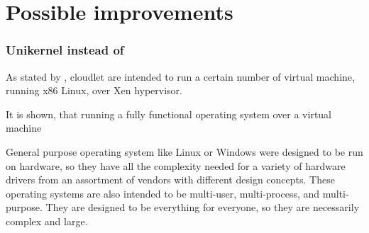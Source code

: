 \documentclass[sigchi]{acmart}
\begin{document}
\section{Possible improvements}

\subsubsection{Unikernel instead of }

As stated by \citet{MSAReport}, cloudlet are intended to run a certain number of virtual machine, running x86 Linux, over Xen hypervisor.

It is shown, that running a fully functional operating system over a virtual machine 

General purpose operating system like Linux or Windows were designed to be run on hardware, so they have all the complexity needed for a variety of hardware drivers from an assortment of vendors with different design concepts. These operating systems are also intended to be multi-user, multi-process, and multi-purpose. They are designed to be everything for everyone, so they are necessarily complex and large.







\appendix
\end{document}
